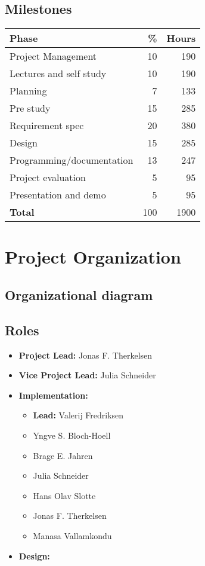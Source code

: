 \subsection{Milestones}
\begin{tabular}{|l|r|r|}
\hline
\textbf{Phase}         	  & \textbf{\%} & \textbf{Hours} \\
\hline
Project Management  	  & 		 10 & 		     190 \\
Lectures and self study   & 		 10 & 			 190 \\
Planning				  &  		  7 & 			 133 \\
Pre study				  & 		 15 & 			 285 \\
Requirement spec		  & 		 20 & 			 380 \\
Design					  & 		 15 & 			 285 \\
Programming/documentation & 		 13 & 			 247 \\
Project evaluation		  &  		  5 &  			  95 \\
Presentation and demo	  &  		  5 &  			  95 \\
\hline
\textbf{Total}			  &			100 &			1900 \\
\hline
\end{tabular}

\section{Project Organization}
\subsection{Organizational diagram}
\subsection{Roles}
\begin{itemize}
\item \textbf{Project Lead:} Jonas F. Therkelsen
\item \textbf{Vice Project Lead:} Julia Schneider
\item \textbf{Implementation:} 
  \begin{itemize}
  \item \textbf{Lead:} Valerij Fredriksen
  \item Yngve S. Bloch-Hoell
  \item Brage E. Jahren
  \item Julia Schneider  
  \item Hans Olav Slotte
  \item Jonas F. Therkelsen
  \item Manasa Vallamkondu
  \end{itemize}   
\item \textbf{Design:}
\end{itemize}
